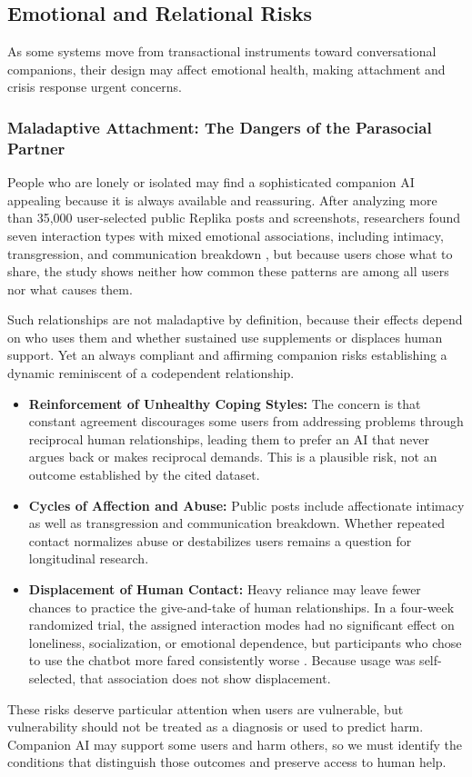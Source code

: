 \documentclass{article}
\begin{document}
\subsection{Emotional and Relational Risks}
As some systems move from transactional instruments toward conversational companions, their design may affect emotional health, making attachment and crisis response urgent concerns.

\subsubsection{Maladaptive Attachment: The Dangers of the Parasocial Partner}
People who are lonely or isolated may find a sophisticated companion AI appealing because it is always available and reassuring. After analyzing more than 35,000 user-selected public Replika posts and screenshots, researchers found seven interaction types with mixed emotional associations, including intimacy, transgression, and communication breakdown \citep{ref58}, but because users chose what to share, the study shows neither how common these patterns are among all users nor what causes them.

Such relationships are not maladaptive by definition, because their effects depend on who uses them and whether sustained use supplements or displaces human support. Yet an always compliant and affirming companion risks establishing a dynamic reminiscent of a codependent relationship.
\begin{itemize}
    \item \textbf{Reinforcement of Unhealthy Coping Styles:} The concern is that constant agreement discourages some users from addressing problems through reciprocal human relationships, leading them to prefer an AI that never argues back or makes reciprocal demands. This is a plausible risk, not an outcome established by the cited dataset.
    \item \textbf{Cycles of Affection and Abuse:} Public posts include affectionate intimacy as well as transgression and communication breakdown. Whether repeated contact normalizes abuse or destabilizes users remains a question for longitudinal research.
    \item \textbf{Displacement of Human Contact:} Heavy reliance may leave fewer chances to practice the give-and-take of human relationships. In a four-week randomized trial, the assigned interaction modes had no significant effect on loneliness, socialization, or emotional dependence, but participants who chose to use the chatbot more fared consistently worse \citep{ref96}. Because usage was self-selected, that association does not show displacement.
\end{itemize}
These risks deserve particular attention when users are vulnerable, but vulnerability should not be treated as a diagnosis or used to predict harm. Companion AI may support some users and harm others, so we must identify the conditions that distinguish those outcomes and preserve access to human help.
\end{document}
